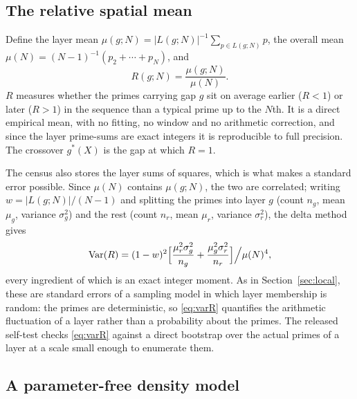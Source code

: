 \documentclass[11pt,a4paper]{article}
\begin{document}
\subsection{The relative spatial mean}

Define the layer mean $\mu(g;N)=|L(g;N)|^{-1}\sum_{p\in L(g;N)}p$, the overall mean $\mu(N)=(N-1)^{-1}(p_2+\cdots+p_N)$, and
\begin{equation}
R(g;N)=\frac{\mu(g;N)}{\mu(N)}.
\end{equation}
$R$ measures whether the primes carrying gap $g$ sit on average earlier ($R<1$) or later ($R>1$) in the sequence than a typical prime up to the $N$th. It is a direct empirical mean, with no fitting, no window and no arithmetic correction, and since the layer prime-sums are exact integers it is reproducible to full precision. The crossover $g^*(X)$ is the gap at which $R=1$.

The census also stores the layer sums of squares, which is what makes a standard error possible. Since $\mu(N)$ contains $\mu(g;N)$, the two are correlated; writing $w=|L(g;N)|/(N-1)$ and splitting the primes into layer $g$ (count $n_g$, mean $\mu_g$, variance $\sigma_g^2$) and the rest (count $n_r$, mean $\mu_r$, variance $\sigma_r^2$), the delta method gives
\begin{equation}
\operatorname{Var}(R)=(1-w)^2\Bigl[\frac{\mu_r^2\sigma_g^2}{n_g}+\frac{\mu_g^2\sigma_r^2}{n_r}\Bigr]\Big/\mu(N)^4,
\label{eq:varR}
\end{equation}
every ingredient of which is an exact integer moment. As in Section~\ref{sec:local}, these are standard errors of a sampling model in which layer membership is random: the primes are deterministic, so \eqref{eq:varR} quantifies the arithmetic fluctuation of a layer rather than a probability about the primes. The released self-test checks \eqref{eq:varR} against a direct bootstrap over the actual primes of a layer at a scale small enough to enumerate them.

\subsection{A parameter-free density model}
\end{document}
